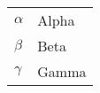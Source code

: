 \begin{nomenclature} %


\begin{tabular}{l l}

  $\alpha$ & Alpha \\
  $\beta$  & Beta \\
  $\gamma$ & Gamma \\

\end{tabular}

\end{nomenclature}




